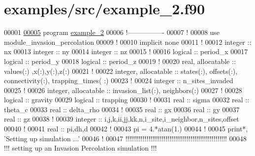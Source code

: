 \hypertarget{example__2_8f90_source}{
\section{examples/src/example\-\_\-2.f90}
}

\begin{DoxyCode}
00001 
\hypertarget{example__2_8f90_source_l00005}{}\hyperlink{example__2_8f90_abc1eb48381332994bda2f9fa625923b1}{00005} \textcolor{keyword}{program} \hyperlink{example__2_8f90_abc1eb48381332994bda2f9fa625923b1}{example_2}
00006 \textcolor{comment}{!----------------}
00007 \textcolor{comment}{!}
00008 use \textcolor{keywordflow}{module\_invasion\_percolation}
00009 \textcolor{comment}{!}
00010 \textcolor{keyword}{implicit none}
00011 \textcolor{comment}{!}
00012 \textcolor{keywordtype}{integer} :: nx
00013 \textcolor{keywordtype}{integer} :: ny
00014 \textcolor{keywordtype}{integer} :: nz
00015 \textcolor{comment}{!}
00016 \textcolor{keywordtype}{logical} :: period\_x 
00017 \textcolor{keywordtype}{logical} :: period\_y
00018 \textcolor{keywordtype}{logical} :: period\_z 
00019 \textcolor{comment}{!}
00020 \textcolor{keywordtype}{real}, \textcolor{keywordtype}{allocatable} :: values(:) ,x(:),y(:),z(:)
00021 \textcolor{comment}{!}
00022 \textcolor{keywordtype}{integer}, \textcolor{keywordtype}{allocatable} :: states(:), offsets(:), connectivity(:), trapping\_times(
      :)
00023 \textcolor{comment}{!}
00024 \textcolor{keywordtype}{integer} :: n\_sites\_invaded
00025 \textcolor{comment}{!}
00026 \textcolor{keywordtype}{integer}, \textcolor{keywordtype}{allocatable} :: invasion\_list(:), neighbors(:)
00027 \textcolor{comment}{!}
00028 \textcolor{keywordtype}{logical} :: gravity 
00029 \textcolor{keywordtype}{logical} :: trapping 
00030 \textcolor{comment}{!}
00031 \textcolor{keywordtype}{real} :: sigma
00032 \textcolor{keywordtype}{real} :: theta\_c 
00033 \textcolor{keywordtype}{real} :: delta\_rho 
00034 \textcolor{comment}{!}
00035 \textcolor{keywordtype}{real} :: gx
00036 \textcolor{keywordtype}{real} :: gy 
00037 \textcolor{keywordtype}{real} :: gz 
00038 \textcolor{comment}{!}
00039 \textcolor{keywordtype}{integer} :: i,j,k,ii,jj,kk,n,i\_site,i\_neighbor,n\_sites,offset
00040 \textcolor{comment}{!}
00041 \textcolor{keywordtype}{real} :: pi,dh,d
00042 \textcolor{comment}{!}
00043 pi = 4.*atan(1.)
00044 \textcolor{comment}{!}
00045 print*, \textcolor{stringliteral}{'Setting up simulation ...'}
00046 \textcolor{comment}{!}
00047 \textcolor{comment}{!!!!!!!!!!!!!!!!!!!!!!!!!!!!!!!!!!!!!!!!!!!!!!!!!!!!!}
00048 \textcolor{comment}{!!! setting up an Invasion Percolation simulation !!!}

\end{DoxyCode}
